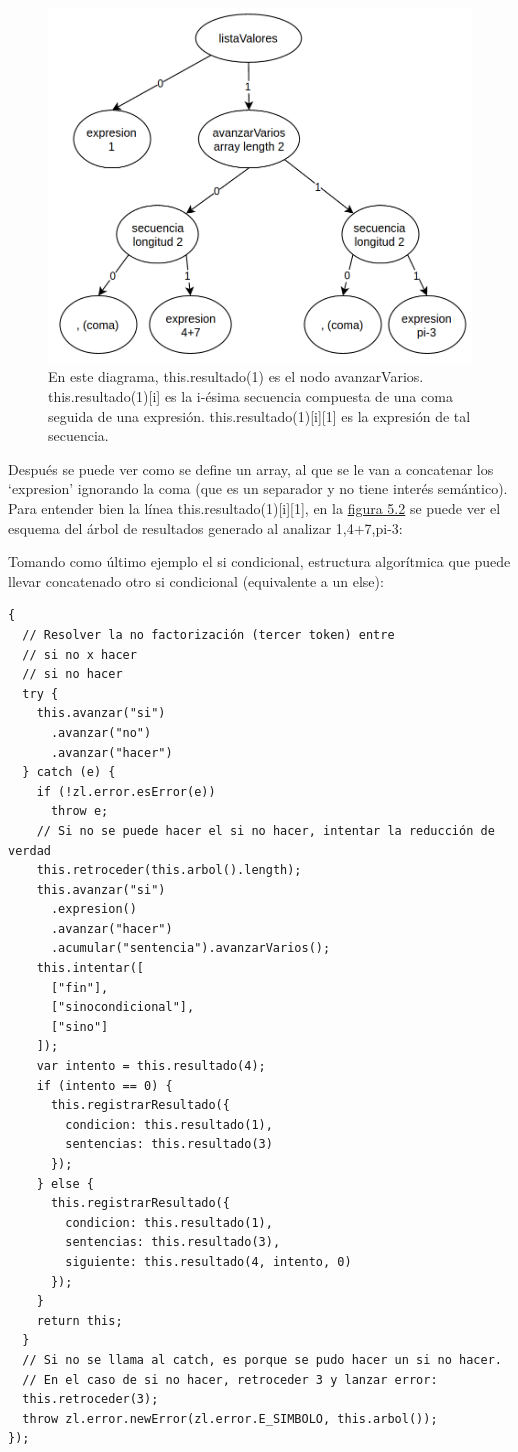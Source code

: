 \documentclass{report}
\begin{document}
	\vspace{10px}

\begin{figure}
	\centering
	\includegraphics[width=0.5\linewidth]{analisisejemplo}
	\caption[Ejemplo de análisis.]{En este diagrama, this.resultado(1) es el nodo avanzarVarios. this.resultado(1)[i] es la i-ésima secuencia compuesta de una coma seguida de una expresión. this.resultado(1)[i][1] es la expresión de tal secuencia.}
	\label{fig:analisisejemplo}
\end{figure}


	Después se puede ver como se define un array, al que se le van a concatenar los `expresion' ignorando la coma (que es un separador y no tiene interés semántico). Para entender bien la línea this.resultado(1)[i][1], en la \hyperref[fig:analisisejemplo]{figura 5.2} se puede ver el esquema del árbol de resultados generado al analizar 1,4+7,pi-3:

	\vspace{10px}

	Tomando como último ejemplo el si condicional, estructura algorítmica que puede llevar concatenado otro si condicional (equivalente a un else):
	
	
\begin{BVerbatim}
{
  // Resolver la no factorización (tercer token) entre
  // si no x hacer
  // si no hacer
  try {
    this.avanzar("si")
      .avanzar("no")
      .avanzar("hacer")
  } catch (e) {
    if (!zl.error.esError(e))
      throw e;
    // Si no se puede hacer el si no hacer, intentar la reducción de verdad
    this.retroceder(this.arbol().length);
    this.avanzar("si")
      .expresion()
      .avanzar("hacer")
      .acumular("sentencia").avanzarVarios();
    this.intentar([
      ["fin"],
      ["sinocondicional"],
      ["sino"]
    ]);
    var intento = this.resultado(4);
    if (intento == 0) {
      this.registrarResultado({
        condicion: this.resultado(1),
        sentencias: this.resultado(3)
      });
    } else {
      this.registrarResultado({
        condicion: this.resultado(1),
        sentencias: this.resultado(3),
        siguiente: this.resultado(4, intento, 0)
      });
    }
    return this;
  }
  // Si no se llama al catch, es porque se pudo hacer un si no hacer.
  // En el caso de si no hacer, retroceder 3 y lanzar error:
  this.retroceder(3);
  throw zl.error.newError(zl.error.E_SIMBOLO, this.arbol());
});
\end{BVerbatim}
	
\end{document}

